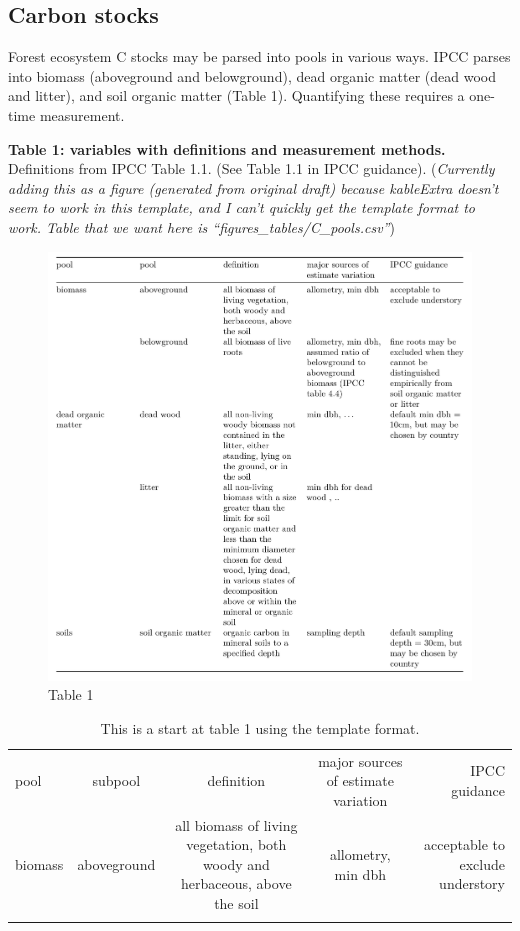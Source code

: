 \documentclass[, manuscript]{copernicus}
\begin{document}
\subsection{Carbon stocks}

Forest ecosystem C stocks may be parsed into pools in various ways. IPCC
parses into biomass (aboveground and belowground), dead organic matter
(dead wood and litter), and soil organic matter (Table 1). Quantifying
these requires a one-time measurement.

\newpage

\textbf{Table 1: variables with definitions and measurement methods.}
Definitions from IPCC Table 1.1. (See Table 1.1 in IPCC guidance).
(\emph{Currently adding this as a figure (generated from original draft)
because kableExtra doesn't seem to work in this template, and I can't
quickly get the template format to work. Table that we want here is
``figures\_tables/C\_pools.csv''})

\begin{figure}
\includegraphics[width=12cm]{figures_tables/C_pools_fig} \caption{Table 1}\label{fig:unnamed-chunk-1}
\end{figure}

\begin{table}[t]
\caption{This is a start at table 1 using the template format. }
\begin{tabular}{l c c c r}
\tophline

pool & subpool & definition & major sources of estimate variation & IPCC guidance \\
\middlehline
biomass & aboveground & all biomass of living vegetation, both woody and herbaceous, above the soil & allometry, min dbh & acceptable to exclude understory  \\

\bottomhline
\end{tabular}
\end{table}
\end{document}
